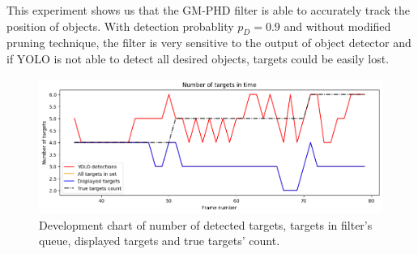 This experiment shows us that the GM-PHD filter is able to accurately track the position of objects. With detection probablity $p_D = 0.9$ and without modified pruning technique, the filter is very sensitive to the output of object detector and if YOLO is not able to detect all desired objects, targets could be easily lost.

\begin{figure}[H]
    \centering
    \includegraphics[width=\linewidth]{../../../experiments/E1/V1/noPd/staticPd_det}
    \caption{Development chart of number of detected targets, targets in filter's queue, displayed targets and true targets' count.}
    \label{gr:E1-V1-S0}
\end{figure}

